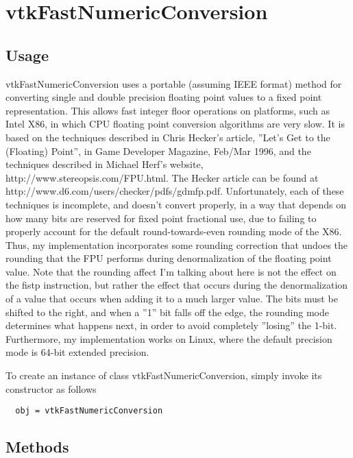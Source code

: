 \section{vtkFastNumericConversion}

\subsection{Usage}

 vtkFastNumericConversion uses a portable (assuming IEEE format) method for
 converting single and double precision floating point values to a fixed
 point representation. This allows fast integer floor operations on
 platforms, such as Intel X86, in which CPU floating point conversion
 algorithms are very slow. It is based on the techniques described in Chris
 Hecker's article, ''Let's Get to the (Floating) Point'', in Game Developer
 Magazine, Feb/Mar 1996, and the techniques described in Michael Herf's
 website, http://www.stereopsis.com/FPU.html.  The Hecker article can be
 found at http://www.d6.com/users/checker/pdfs/gdmfp.pdf.  Unfortunately,
 each of these techniques is incomplete, and doesn't convert properly, in a
 way that depends on how many bits are reserved for fixed point fractional
 use, due to failing to properly account for the default round-towards-even
 rounding mode of the X86. Thus, my implementation incorporates some
 rounding correction that undoes the rounding that the FPU performs during
 denormalization of the floating point value. Note that the rounding affect
 I'm talking about here is not the effect on the fistp instruction, but
 rather the effect that occurs during the denormalization of a value that
 occurs when adding it to a much larger value. The bits must be shifted to
 the right, and when a ''1'' bit falls off the edge, the rounding mode
 determines what happens next, in order to avoid completely ''losing'' the
 1-bit. Furthermore, my implementation works on Linux, where the default
 precision mode is 64-bit extended precision.

To create an instance of class vtkFastNumericConversion, simply
invoke its constructor as follows
\begin{verbatim}
  obj = vtkFastNumericConversion
\end{verbatim}
\subsection{Methods}

